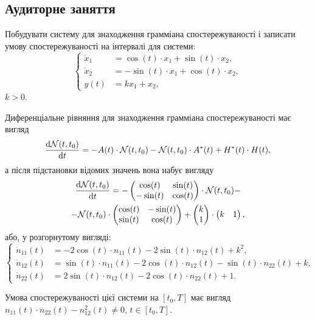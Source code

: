\subsection{Аудиторне заняття}

\begin{problem}
	Побудувати систему для знаходження грамміана спостережуваності і записати умову спостережуваності на інтервалі для системи: \[
	\left\{
		\begin{aligned}
			\dot x_1 &= \cos(t) \cdot x_1 + \sin(t) \cdot x_2, \\
			\dot x_2 &= - \sin(t) \cdot x_1 + \cos(t) \cdot x_2, \\
			y(t) &= k x_1 + x_2,
		\end{aligned}
	\right.
	\]
	$k > 0$.
\end{problem}

\begin{solution}
	Диференціальне рівняння для знаходження грамміана спостережуваності має вигляд \[ \frac{\mathop{}\!\mathrm{d} \mathcal{N}(t, t_0)}{\mathop{}\!\mathrm{d} t} = -A(t) \cdot \mathcal{N}(t, t_0) - \mathcal{N}(t, t_0) \cdot A^*(t) + H^*(t) \cdot H(t), \] а після підстановки відомих значень вона набує вигляду \begin{multline*} 
		\frac{\mathop{}\!\mathrm{d} \mathcal{N}(t, t_0)}{\mathop{}\!\mathrm{d} t} = -\begin{pmatrix} \cos (t) & \sin(t) \\ - \sin(t) & \cos(t) \end{pmatrix} \cdot \mathcal{N}(t, t_0) - \\
		- \mathcal{N}(t, t_0) \cdot \begin{pmatrix} \cos (t) & -\sin(t) \\ \sin(t) & \cos(t) \end{pmatrix} + \begin{pmatrix} k \\ 1 \end{pmatrix} \cdot \begin{pmatrix} k & 1 \end{pmatrix}, 
	\end{multline*} або, у розгорнутому вигляді: \[
	\left\{
		\begin{aligned}
			\dot n_{11} (t) &= - 2 \cos(t) \cdot n_{11} (t) - 2 \sin(t) \cdot n_{12} (t) + k^2, \\
			\dot n_{12} (t) &= \sin (t) \cdot n_{11} (t) - 2\cos(t) \cdot n_{12} (t) - \sin (t) \cdot n_{22} (t) + k, \\
			\dot n_{22} (t) &= 2 \sin(t) \cdot n_{12} (t) - 2 \cos(t) \cdot n_{22} (t) + 1.
		\end{aligned}
	\right.
	\]

	Умова спостережуваності цієї системи на $[t_0, T]$ має вигляд  $n_{11} (t) \cdot n_{22} (t) - n_{12}^2 (t) \ne 0$, $t \in [t_0, T]$.
\end{solution}

